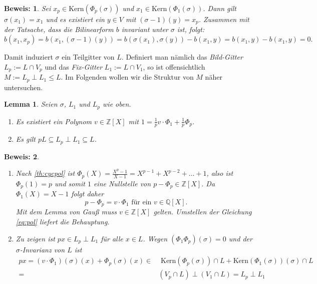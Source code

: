 \documentclass[12pt,a4paper,halfparskip,headsepline,bibtotocnumbered]{scrreprt}
\theoremstyle{nummermitklammern}
\newtheorem{lemma}[defsatzusw]{Lemma}
\theoremstyle{nonumberbreak}
\newtheorem{beweis}{Beweis:}
\newcommand{\Z}{\mathbb{Z}}
\newcommand{\Q}{\mathbb{Q}}
\newcommand{\Kern}{\text{Kern}}
\begin{document}
\begin{beweis}
	Sei $x_p \in \Kern(\Phi_p(\sigma))$ und $x_1 \in \Kern(\Phi_1(\sigma))$. Dann gilt $\sigma(x_1) = x_1$ und es existiert ein $y \in V$ mit $(\sigma - 1)(y) = x_p$. Zusammen mit der Tatsache, dass die Bilinearform $b$ invariant unter $\sigma$ ist, folgt:
	\begin{equation*}
		b(x_1, x_p) = b(x_1, (\sigma-1)(y)) = b(\sigma(x_1), \sigma(y)) - b(x_1, y) = b(x_1, y) - b(x_1, y) = 0.
	\end{equation*}
\end{beweis}

Damit induziert $\sigma$ ein Teilgitter von $L$. Definiert man nämlich das \textit{Bild-Gitter} $L_p := L \cap V_p$ und das \textit{Fix-Gitter} $L_1 := L \cap V_1$, so ist offensichtlich $M := L_p \perp L_1 \leq L$. Im Folgenden wollen wir die Struktur von $M$ näher untersuchen.

\begin{framed}
	\begin{lemma}\label{lem:pL}
		Seien $\sigma$, $L_1$ und $L_p$ wie oben.
		\begin{enumerate}[label=(\roman*)]
			\item Es existiert ein Polynom $v \in \Z\left[ X \right]$ mit $1 = \frac{1}{p} v \cdot \Phi_1 + \frac{1}{p}\Phi_p$.
			\item Es gilt $pL \subseteq L_p \perp L_1 \subseteq L$.
		\end{enumerate}
	\end{lemma}
\end{framed}

\begin{beweis}
	\begin{enumerate}[label=(\roman*)]
		\item Nach \eqref{th:cycpol} ist $\Phi_p(X) = \frac{X^p-1}{X-1} = X^{p-1} + X^{p-2} + \dots + 1$, also ist $\Phi_p(1) = p$ und somit $1$ eine Nullstelle von $p - \Phi_p \in \Z\left[ X \right]$. Da $\Phi_1(X) = X-1$ folgt daher 
			\begin{equation}\label{eq:pol}
				p - \Phi_p = v \cdot\Phi_1 \text{ für ein } v \in \Q\left[X\right].
			\end{equation}
			Mit dem Lemma von Gauß muss $v \in \Z \left[ X \right]$ gelten. Umstellen der Gleichung \eqref{eq:pol} liefert die Behauptung.
		\item Zu zeigen ist $p x \in L_p \perp L_1$ für alle $x \in L$. Wegen $(\Phi_1 \Phi_p)(\sigma) = 0$ und der $\sigma$-Invarianz von $L$ ist
			\begin{align*}
				px = (v \cdot \Phi_1)(\sigma)(x) + \Phi_p(\sigma)(x) \in &\text{ Kern}(\Phi_p(\sigma)) \cap L + \Kern(\Phi_1(\sigma))(\sigma) \cap L\\
				=& (V_p \cap L) \perp (V_1 \cap L) = L_p \perp L_1
			\end{align*}
	\end{enumerate}
\end{beweis}
\end{document}
